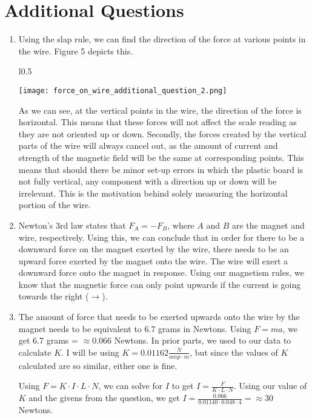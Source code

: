 \documentclass[11pt,twoside]{article}
\begin{document}
\section{Additional Questions}

\begin{enumerate}
    \item Using the slap rule, we can find the direction of the force at various points in the wire. Figure 5 depicts this.  
    
    \parbox{\linewidth}{\centering
    \begin{wrapfigure}{l}{0.5\textwidth}
        \centering
        \caption{}
        \texttt{[image: force\_on\_wire\_additional\_question\_2.png]}
    \end{wrapfigure}
    
    As we can see, at the vertical points in the wire, the direction of the force is horizontal. This means that these forces will not affect the scale reading as they are not oriented up or down. Secondly, the forces created by the vertical parts of the wire will always cancel out, as the amount of current and strength of the magnetic field will be the same at corresponding points. This means that should there be minor set-up errors in which the plastic board is not fully vertical, any component with a direction up or down will be irrelevant. This is the motivation behind solely measuring the horizontal portion of the wire. 
    }
    \linebreak %
    
    \item Newton's 3rd law states that $F_A = -F_B$, where $A$ and $B$ are the magnet and wire, respectively. Using this, we can conclude that in order for there to be a downward force on the magnet exerted by the wire, there needs to be an upward force exerted by the magnet onto the wire. The wire will exert a downward force onto the magnet in response. Using our magnetism rules, we know that the magnetic force can only point upwards if the current is going towards the right ($\rightarrow$).  
    
    \item The amount of force that needs to be exerted upwards onto the wire by the magnet needs to be equivalent to 6.7 grams in Newtons. Using $F = ma$, we get 6.7 grams = $\approx 0.066$ Newtons. In prior parts, we used to our data to calculate $K$. I will be using $K = 0.01162 \frac{N}{amp \cdot m}$, but since the values of $K$ calculated are so similar, either one is fine. 
    
    Using $F = K \cdot I \cdot L \cdot N$, we can solve for $I$ to get $I = \frac{F}{K \cdot L \cdot N}$. Using our value of $K$ and the givens from the question, we get $I = \frac{0.066}{0.01140 \cdot 0.048 \cdot 4} = \approx 30$ Newtons. 
    
\end{enumerate}
\end{document}
